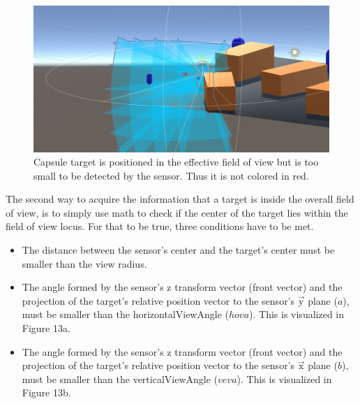 \documentclass{article}
\begin{document}
\begin{figure} %
	\centering
	\includegraphics[width=1\columnwidth]{FOV(16).png} %
	\caption{Capsule target is positioned in the effective field of view but is too small to be detected by the sensor. Thus it is not colored in red.}
\end{figure}

The second way to acquire the information that a target is inside the overall field of view, is to simply use math to check if the center of the target lies within the field of view locus. For that to be true, three conditions have to be met. 
\begin{itemize}
    \item The distance between the sensor's center and the target's center must be smaller than the view radius.
    \item The angle formed by the sensor's z transform vector (front vector) and the projection of the target's relative position vector to the sensor's $\overrightarrow{\text{y}}$ plane ($a$), must be smaller than the horizontalViewAngle ($hova$). This is visualized in Figure 13a.
    \item The angle formed by the sensor's z transform vector (front vector) and the projection of the target's relative position vector to the sensor's $\overrightarrow{\text{x}}$ plane ($b$), must be smaller than the verticalViewAngle ($veva$). This is visualized in Figure 13b.
\end{itemize}
\end{document}
